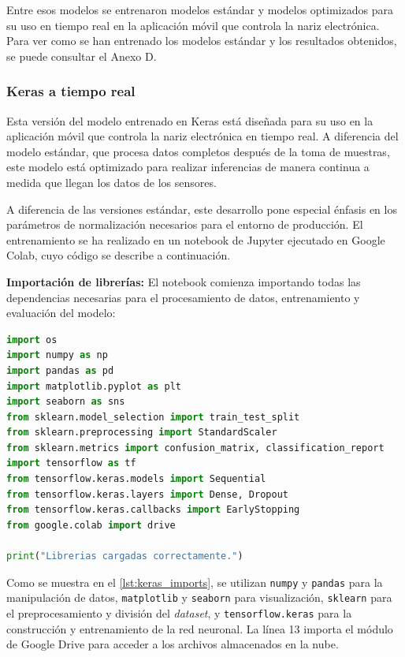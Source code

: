 Entre esos modelos se entrenaron modelos estándar y modelos optimizados para su uso en tiempo real en la aplicación móvil que controla la nariz electrónica. Para ver como se han entrenado los modelos estándar y los resultados obtenidos, se puede consultar el Anexo D.

\subsubsection{Keras a tiempo real}
Esta versión del modelo entrenado en Keras está diseñada para su uso en la aplicación móvil que controla la nariz electrónica en tiempo real. A diferencia del modelo estándar, que procesa datos completos después de la toma de muestras, este modelo está optimizado para realizar inferencias de manera continua a medida que llegan los datos de los sensores.
\par

A diferencia de las versiones estándar, este desarrollo pone especial énfasis en los parámetros de normalización necesarios para el entorno de producción. El entrenamiento se ha realizado en un notebook de Jupyter ejecutado en Google Colab, cuyo código se describe a continuación.

\textbf{Importación de librerías:} El notebook comienza importando todas las dependencias necesarias para el procesamiento de datos, entrenamiento y evaluación del modelo:

\begin{lstlisting}[language=Python, caption={Importación de librerías para el entrenamiento del modelo.}, label={lst:keras_imports}]
import os
import numpy as np
import pandas as pd
import matplotlib.pyplot as plt
import seaborn as sns
from sklearn.model_selection import train_test_split
from sklearn.preprocessing import StandardScaler
from sklearn.metrics import confusion_matrix, classification_report
import tensorflow as tf
from tensorflow.keras.models import Sequential
from tensorflow.keras.layers import Dense, Dropout
from tensorflow.keras.callbacks import EarlyStopping
from google.colab import drive

print("Librerias cargadas correctamente.")
\end{lstlisting}

Como se muestra en el \autoref{lst:keras_imports}, se utilizan \texttt{numpy} y \texttt{pandas} para la manipulación de datos, \texttt{matplotlib} y \texttt{seaborn} para visualización, \texttt{sklearn} para el preprocesamiento y división del \textit{dataset}, y \texttt{tensorflow.keras} para la construcción y entrenamiento de la red neuronal. La línea 13 importa el módulo de Google Drive para acceder a los archivos almacenados en la nube.

